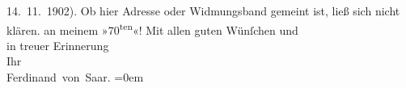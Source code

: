 \begin{ledgroupsized}[t]{13cm}
{{{                  14. 11. 1902). Ob hier Adresse oder Widmungsband gemeint ist, ließ
                  sich nicht klären.}}}\label{K_L01240-1h} an meinem »70\textsuperscript{ten}«!\pend
           \pstart
           Mit allen guten Wünſchen und{\\[\baselineskip]}in treuer Erinnerung{\\[\baselineskip]}Ihr{\\[\baselineskip]}\spacefill\mbox{Ferdinand von Saar.}\pend
           \leftskip=0em{}
         
         \endnumbering{}\end{ledgroupsized}  \newcommand{\dateiname}{L01240}\newcommand{\titel}{Ferdinand von Saar an Arthur Schnitzler, 11. 10. 1902}\newcommand{\editorInnen}{Martin Anton Müller und Gerd-Hermann Susen}
      